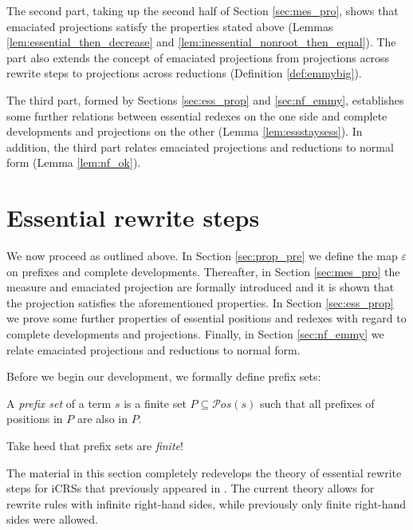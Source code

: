\documentclass{LMCS}
\theoremstyle{definition}
\newcommand{\pos}[1]{\mathcal{P}os(#1)}
\newcommand{\pmap}{\varepsilon}
\begin{document}
\begin{figure}[omitted: a diagram of this paper's results, not reproduced here]\label{fig:road}\end{figure}

The second part, taking up the second half of Section \ref{sec:mes_pro}, shows that emaciated projections satisfy the properties stated above (Lemmas \ref{lem:essential_then_decrease} and \ref{lem:inessential_nonroot_then_equal}). The part also extends the concept of emaciated projections from projections across rewrite steps to projections across reductions (Definition \ref{def:emmybig}).

The third part, formed by Sections \ref{sec:ess_prop} and \ref{sec:nf_emmy}, establishes some further relations between essential redexes on the one side and complete developments and projections on the other (Lemma \ref{lem:essstaysess}). In addition, the third part relates emaciated projections and reductions to normal form (Lemma \ref{lem:nf_ok}).

\section{Essential rewrite steps}
\label{sec:ess}

We now proceed as outlined above. In Section \ref{sec:prop_pre} we define the map $\pmap$ on prefixes and complete developments. Thereafter, in Section \ref{sec:mes_pro} the measure and emaciated projection are formally introduced and it is shown that the projection satisfies the aforementioned properties. In Section \ref{sec:ess_prop} we prove some further properties of essential positions and redexes with regard to complete developments and projections. Finally, in Section \ref{sec:nf_emmy} we relate emaciated projections and reductions to normal form.

Before we begin our development, we formally define prefix sets:
\begin{defi}
A \emph{prefix set} of a term $s$ is a finite set $P \subseteq \pos{s}$ such that all prefixes of positions in $P$ are also in $P$.
\end{defi}

\noindent
Take heed that prefix sets are \emph{finite}!

\begin{rem}
The material in this section completely redevelops the theory of essential rewrite steps for iCRSs that previously appeared in \cite{JJ05b}. The current theory allows for rewrite rules with infinite right-hand sides, while previously only finite right-hand sides were allowed.
\end{rem}
\end{document}
